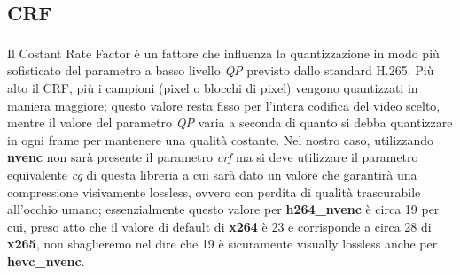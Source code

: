 \subsection*{CRF}
Il Costant Rate Factor\textsuperscript{\cite{CRF_vs_QP}}  è un fattore che influenza la quantizzazione in modo più sofisticato del parametro a basso livello \emph{QP} previsto dallo standard H.265. Più alto il CRF, più i campioni (pixel o blocchi di pixel) vengono quantizzati in maniera maggiore; questo valore resta fisso per l'intera codifica del video scelto, mentre il valore del parametro \emph{QP} varia a seconda di quanto si debba quantizzare in ogni frame per mantenere una qualità costante.
Nel nostro caso, utilizzando \textbf{nvenc} non sarà presente il parametro \emph{crf} ma si deve utilizzare il parametro equivalente \emph{cq} di questa libreria a cui sarà dato un valore che garantirà una compressione visivamente lossless, ovvero con perdita di qualità trascurabile all'occhio umano; essenzialmente questo valore per \textbf{h264\_nvenc} è circa 19 per cui, preso atto che il valore di default di \textbf{x264} è 23 e corrisponde a circa 28 di \textbf{x265}, non sbaglieremo nel dire che 19 è sicuramente visually lossless anche per \textbf{hevc\_nvenc}.
